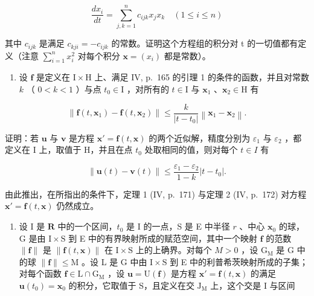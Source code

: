 \[
\frac {d x _ {i}}{d t} = \sum_ {j, k = 1} ^ {n} c _ {i j k} x _ {j} x _ {k} \quad (1 \leqslant i \leqslant n)
\]

其中 \(c_{ijk}\) 是满足 \(c_{kji} = -c_{ijk}\) 的常数。证明这个方程组的积分对 t 的一切值都有定义（注意 \(\sum_{i=1}^{n} x_{i}^{2}\) 对每个积分 \(\mathbf{x} = (x_{i})\) 都是常数）。

\begin{enumerate}
\def\labelenumi{\arabic{enumi})}
\setcounter{enumi}{7}
\tightlist
\item
  设 \(\mathbf{f}\) 是定义在 \(\mathrm{I} \times \mathrm{H}\) 上、满足 IV, p.~165 的引理 1 的条件的函数，并且对常数 \(k\) （ \(0 < k < 1\) ）与点 \(t_0 \in \mathrm{I}\) ，对所有的 \(t \in \mathrm{I}\) 与 \(\mathbf{x}_1\) 、\(\mathbf{x}_2 \in \mathrm{H}\) 有
\end{enumerate}

\[
\left\| \mathbf {f} (t, \mathbf {x} _ {1}) - \mathbf {f} (t, \mathbf {x} _ {2}) \right\| \leqslant \frac {k}{\left| t - t _ {0} \right|} \left\| \mathbf {x} _ {1} - \mathbf {x} _ {2} \right\|.
\]

证明：若 \(\mathbf{u}\) 与 \(\mathbf{v}\) 是方程 \(\mathbf{x}' = \mathbf{f}(t, \mathbf{x})\) 的两个近似解，精度分别为 \(\varepsilon_1\) 与 \(\varepsilon_2\) ，都定义在 I 上，取值于 H，并且在点 \(t_0\) 处取相同的值，则对每个 \(t \in I\) 有

\[
\left\| \mathbf {u} (t) - \mathbf {v} (t) \right\| \leqslant \frac {\varepsilon_ {1} - \varepsilon_ {2}}{1 - k} | t - t _ {0} |.
\]

由此推出，在所指出的条件下，定理 1 (IV, p.~171) 与定理 2 (IV, p.~172) 对方程 \(\mathbf{x}' = \mathbf{f}(t, \mathbf{x})\) 仍然成立。

\begin{enumerate}
\def\labelenumi{* \arabic{enumi})}
\setcounter{enumi}{8}
\tightlist
\item
  设 I 是 \(\mathbf{R}\) 中的一个区间，\(t_0\) 是 I 的一点，S 是 E 中半径 \(r\) 、中心 \(\mathbf{x}_0\) 的球，G 是由 \(\mathrm{I} \times \mathrm{S}\) 到 E 中的有界映射所成的赋范空间，其中一个映射 \(\mathbf{f}\) 的范数 \(\| \mathbf{f} \|\) 是 \(\| \mathbf{f}(t, \mathbf{x}) \|\) 在 \(\mathrm{I} \times \mathrm{S}\) 上的上确界。对每个 \(M > 0\) ，设 \(\mathrm{G}_{\mathrm{M}}\) 是 G 中的球 \(\| \mathbf{f} \| \leqslant \mathrm{M}\) 。设 L 是 G 中由 \(\mathrm{I} \times \mathrm{S}\) 到 E 中的利普希茨映射所成的子集；对每个函数 \(\mathbf{f} \in \mathrm{L} \cap \mathrm{G}_{\mathrm{M}}\) ，设 \(\mathbf{u} = \mathrm{U}(\mathbf{f})\) 是方程 \(\mathbf{x}' = \mathbf{f}(t, \mathbf{x})\) 的满足 \(\mathbf{u}(t_0) = \mathbf{x}_0\) 的积分，它取值于 S，且定义在交 \(\mathrm{J}_{\mathrm{M}}\) 上，这个交是 I 与区间
\end{enumerate}

